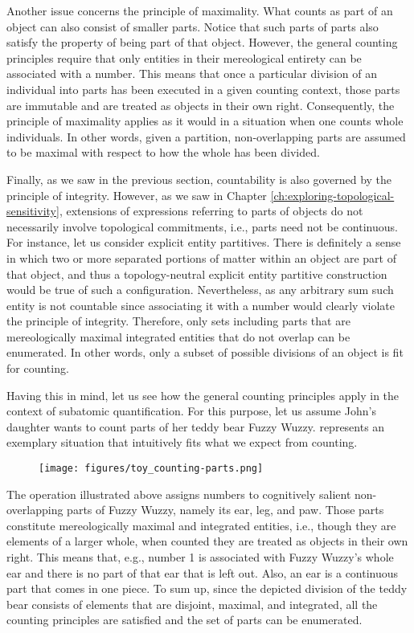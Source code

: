 Another issue concerns the principle of maximality. What counts as part of an object can also consist of smaller parts. Notice that such parts of parts also satisfy the property of being part of that object. However, the general counting principles require that only entities in their mereological entirety can be associated with a number. This means that once a particular division of an individual into parts has been executed in a given counting context, those parts are immutable and are treated as objects in their own right. Consequently, the principle of maximality applies as it would in a situation when one counts whole individuals. In other words, given a partition, non-overlapping parts are assumed to be maximal with respect to how the whole has been divided.

Finally, as we saw in the previous section, countability is also governed by the principle of integrity. However, as we saw in Chapter \ref{ch:exploring-topological-sensitivity}, extensions of expressions referring to parts of objects do not necessarily involve topological commitments, i.e., parts need not be continuous. For instance, let us consider explicit entity partitives. There is definitely a sense in which two or more separated portions of matter within an object are part of that object, and thus a topology-neutral explicit entity partitive construction would be true of such a configuration. Nevertheless, as any arbitrary sum such entity is not countable since associating it with a number would clearly violate the principle of integrity. Therefore, only sets including parts that are mereologically maximal integrated entities that do not overlap can be enumerated. In other words, only a subset of possible divisions of an object is fit for counting.

Having this in mind, let us see how the general counting principles apply in the context of subatomic quantification. For this purpose, let us assume John's daughter wants to count parts of her teddy bear Fuzzy Wuzzy.  represents an exemplary situation that intuitively fits what we expect from counting. 

\begin{figure}[h!]
\centering
\texttt{[image: figures/toy\_counting-parts.png]}
\label{fig:counting-of-parts}
\end{figure}

The operation illustrated above assigns numbers to cognitively salient non-overlapping parts of Fuzzy Wuzzy, namely its ear, leg, and paw. Those parts constitute mereologically maximal and integrated entities, i.e., though they are elements of a larger whole, when counted they are treated as objects in their own right. This means that, e.g., number 1 is associated with Fuzzy Wuzzy's whole ear and there is no part of that ear that is left out. Also, an ear is a continuous part that comes in one piece. To sum up, since the depicted division of the teddy bear consists of elements that are disjoint, maximal, and integrated, all the counting principles are satisfied and the set of parts can be enumerated.

